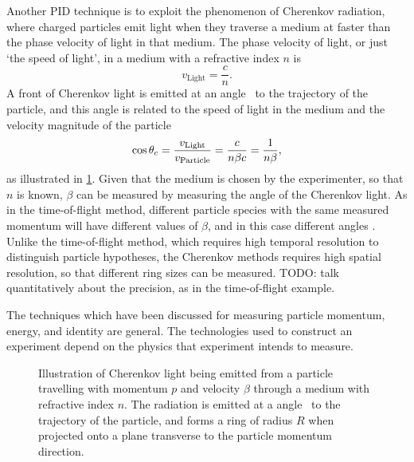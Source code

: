 Another \ac{PID} technique is to exploit the phenomenon of Cherenkov radiation, 
where charged particles emit light when they traverse a medium at faster than 
the phase velocity of light in that medium.
The phase velocity of light, or just `the speed of light', in a medium with a 
refractive index $n$ is
\begin{equation}
  v_{\text{Light}} = \frac{c}{n}.
\end{equation}
A front of Cherenkov light is emitted at an angle \cherenkovangle\ to the 
trajectory of the particle, and this angle is related to the speed of light in 
the medium and the velocity magnitude of the particle
\begin{equation}
  \cos{\ensuremath{\theta_{c}}} = \frac{v_{\text{Light}}}{v_{\text{Particle}}}
                        = \frac{c}{n\beta c}
                        = \frac{1}{n\beta},
\end{equation}
as illustrated in \cref{fig:intro:lhcb:cherenkov}.
Given that the medium is chosen by the experimenter, so that $n$ is known, 
$\beta$ can be measured by measuring the angle of the Cherenkov light.
As in the time-of-flight method, different particle species with the same 
measured momentum will have different values of $\beta$, and in this case 
different angles \cherenkovangle.
Unlike the time-of-flight method, which requires high temporal resolution to 
distinguish particle hypotheses, the Cherenkov methods requires high spatial 
resolution, so that different ring sizes can be measured.
TODO: talk quantitatively about the precision, as in the time-of-flight example.


The techniques which have been discussed for measuring particle momentum, 
energy, and identity are general.
The technologies used to construct an experiment depend on the physics that 
experiment intends to measure.

\begin{figure}
  \centering
  
  \caption{%
    Illustration of Cherenkov light being emitted from a particle travelling 
    with momentum $p$ and velocity $\beta$ through a medium with refractive 
    index $n$.
    The radiation is emitted at a angle \cherenkovangle\ to the trajectory of 
    the particle, and forms a ring of radius $R$ when projected onto a plane 
    transverse to the particle momentum direction.
  }
  \label{fig:intro:lhcb:cherenkov}
\end{figure}

